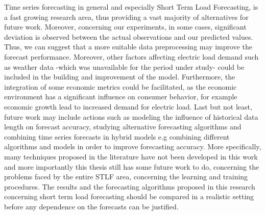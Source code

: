 \par
Time series forecasting in general and especially Short Term Load Forecasting, is a fast growing research area, thus providing a vast majority of alternatives for future work. Moreover, concerning our experiments, in some cases, significant deviation is observed between the actual observations and our predicted values. Thus, we can suggest that a more suitable data preprocessing may improve the forecast performance. Moreover,
other factors affecting electric load demand such as weather data -which was unavailable for the period under study- could be included in the building and improvement of the model. Furthermore, the integration of some economic metrics could be facilitated, as the economic environment has a significant influence on consumer behavior, for example economic growth lead to increased demand for electric load. Last but not least, future work may include actions such as modeling the influence of historical data length on forecast accuracy, studying alternative forecasting algorithms and combining time series forecasts in hybrid models e.g combining different algorithms and models in order to improve forecasting accuracy. More specifically, many techniques proposed in the literature have not been developed in this work and more importantly this thesis still has some future work to do, concerning the problems faced by the entire
STLF area, concerning the learning and training procedures. The results and the forecasting algorithms proposed in this research concerning short term load forecasting should be compared in a realistic
setting before any dependence on the forecasts can be justified.












